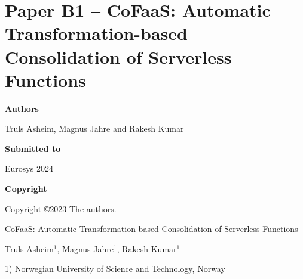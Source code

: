 \documentclass[../../../main.tex]{subfiles}
\begin{document}
\chapter[Paper B1 -- CoFaaS: Automatic Consolidation of Serverless Functions][Paper B1 -- CoFaaS: Consolidation of Serverless Functions]{Paper B1 -- CoFaaS: Automatic Transformation-based Consolidation of Serverless Functions }

\label{chap:eurosys-paper}

\noindent \textbf{Authors}

\vspace*{0.3cm}

\noindent Truls Asheim, Magnus Jahre and Rakesh Kumar

\vspace*{0.7cm}

\noindent \textbf{Submitted to}

\vspace*{0.3cm}

\noindent Eurosys 2024

\vspace*{0.7cm}

\noindent \textbf{Copyright}

\vspace*{0.3cm}

\noindent Copyright ©2023 The authors.

\newpage

\vspace*{0.1cm}

\begin{center}

\Huge{CoFaaS: Automatic Transformation-based Consolidation of Serverless Functions}

\vspace{0.6cm}

\large{Truls Asheim$^{1}$, Magnus Jahre$^{1}$, Rakesh Kumar$^{1}$}

\vspace{0.1cm}

\small{1) Norwegian University of Science and Technology, Norway}


\end{center}
\end{document}
